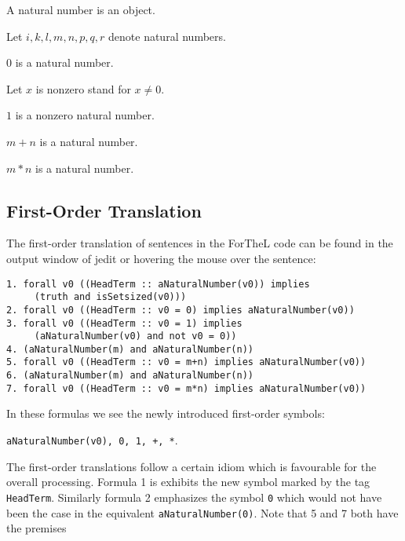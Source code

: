 \documentclass[11pt]{article}
\begin{document}
\begin{forthel}

\begin{signature}  A natural number is an object.
\end{signature}

Let $i,k,l,m,n,p,q,r$ denote natural numbers.

\begin{signature} $0$ is a natural number.
\end{signature}

Let $x$ is nonzero stand for $x \neq 0$.

\begin{signature} $1$ is a nonzero natural number.
\end{signature}

\begin{signature} $m + n$ is a natural number.
\end{signature}

\begin{signature} $m * n$ is a natural number.
\end{signature}
\end{forthel}

\subsection{First-Order Translation}
The first-order translation
of sentences in the ForTheL code can be found in the output
window of jedit or hovering the mouse
over the sentence:
\begin{small}
\begin{verbatim}
1. forall v0 ((HeadTerm :: aNaturalNumber(v0)) implies 
     (truth and isSetsized(v0)))
2. forall v0 ((HeadTerm :: v0 = 0) implies aNaturalNumber(v0)) 
3. forall v0 ((HeadTerm :: v0 = 1) implies 
     (aNaturalNumber(v0) and not v0 = 0)) 
4. (aNaturalNumber(m) and aNaturalNumber(n)) 
5. forall v0 ((HeadTerm :: v0 = m+n) implies aNaturalNumber(v0)) 
6. (aNaturalNumber(m) and aNaturalNumber(n)) 
7. forall v0 ((HeadTerm :: v0 = m*n) implies aNaturalNumber(v0)) 
\end{verbatim}
\end{small}
In these formulas we see the newly introduced first-order symbols:

\verb_aNaturalNumber(v0), 0, 1, +, *_.

The first-order translations follow a certain idiom which
is favourable for the overall processing. Formula 1 is
exhibits
the new symbol marked by the tag \verb+HeadTerm+. Similarly
formula 2 emphasizes the symbol \verb+0+ which would not have been
the case in the equivalent \verb+aNaturalNumber(0)+.
Note that 5 and 7 both have the premises
\end{document}

